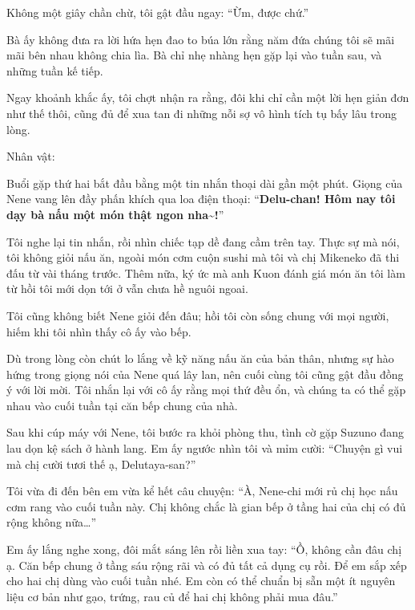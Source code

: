 \documentclass[../main.tex]{subfiles}
\begin{document}
Không một giây chần chừ, tôi gật đầu ngay: ``Ừm, được chứ.''

Bà ấy không đưa ra lời hứa hẹn đao to búa lớn rằng năm đứa chúng tôi sẽ mãi mãi bên nhau không chia lìa. Bà chỉ nhẹ nhàng hẹn gặp lại vào tuần sau, và những tuần kế tiếp.

Ngay khoảnh khắc ấy, tôi chợt nhận ra rằng, đôi khi chỉ cần một lời hẹn giản đơn như thế thôi, cũng đủ để xua tan đi những nỗi sợ vô hình tích tụ bấy lâu trong lòng.

\newpage

\begin{center}
    {\caviar\fontsize{12pt}{12pt}\selectfont Nhân vật:   }
\end{center}

Buổi gặp thứ hai bắt đầu bằng một tin nhắn thoại dài gần một phút. Giọng của Nene vang lên đầy phấn khích qua loa điện thoại: ``\textbf{Delu-chan! Hôm nay tôi dạy bà nấu một món thật ngon nha\~{}!}''

Tôi nghe lại tin nhắn, rồi nhìn chiếc tạp dề đang cầm trên tay. Thực sự mà nói, tôi không giỏi nấu ăn, ngoài món cơm cuộn sushi mà tôi và chị Mikeneko đã thi đấu từ vài tháng trước. Thêm nữa, ký ức mà anh Kuon đánh giá món ăn tôi làm từ hồi tôi mới dọn tới ở vẫn chưa hề nguôi ngoai.

Tôi cũng không biết Nene giỏi đến đâu; hồi tôi còn sống chung với mọi người, hiếm khi tôi nhìn thấy cô ấy vào bếp.

Dù trong lòng còn chút lo lắng về kỹ năng nấu ăn của bản thân, nhưng sự hào hứng trong giọng nói của Nene quá lây lan, nên cuối cùng tôi cũng gật đầu đồng ý với lời mời. Tôi nhắn lại với cô ấy rằng mọi thứ đều ổn, và chúng ta có thể gặp nhau vào cuối tuần tại căn bếp chung của nhà.

Sau khi cúp máy với Nene, tôi bước ra khỏi phòng thu, tình cờ gặp Suzuno đang lau dọn kệ sách ở hành lang. Em ấy ngước nhìn tôi và mỉm cười: ``Chuyện gì vui mà chị cười tươi thế ạ, Delutaya-san?''

Tôi vừa đi đến bên em vừa kể hết câu chuyện: ``À, Nene-chi mới rủ chị học nấu cơm rang vào cuối tuần này. Chị không chắc là gian bếp ở tầng hai của chị có đủ rộng không nữa\dots''

Em ấy lắng nghe xong, đôi mắt sáng lên rồi liền xua tay: ``Ồ, không cần đâu chị ạ. Căn bếp chung ở tầng sáu rộng rãi và có đủ tất cả dụng cụ rồi. Để em sắp xếp cho hai chị dùng vào cuối tuần nhé. Em còn có thể chuẩn bị sẵn một ít nguyên liệu cơ bản như gạo, trứng, rau củ để hai chị không phải mua đâu.''
\end{document}
